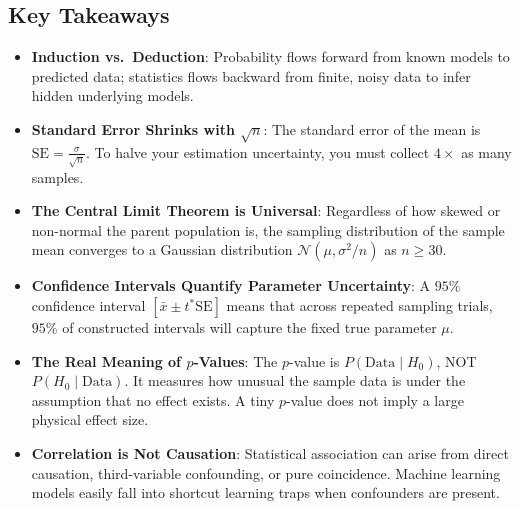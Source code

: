\subsection{Key Takeaways}\label{subsec:stat_takeaways}

\begin{takeaways}
\begin{itemize}
    \item \textbf{Induction vs.\ Deduction}: Probability flows forward from known models to predicted data; statistics flows backward from finite, noisy data to infer hidden underlying models.
    \item \textbf{Standard Error Shrinks with $\sqrt{n}$}: The standard error of the mean is $\text{SE} = \frac{\sigma}{\sqrt{n}}$. To halve your estimation uncertainty, you must collect $4\times$ as many samples.
    \item \textbf{The Central Limit Theorem is Universal}: Regardless of how skewed or non-normal the parent population is, the sampling distribution of the sample mean converges to a Gaussian distribution $\mathcal{N}(\mu, \sigma^2/n)$ as $n \ge 30$.
    \item \textbf{Confidence Intervals Quantify Parameter Uncertainty}: A $95\%$ confidence interval $[\bar{x} \pm t^* \text{SE}]$ means that across repeated sampling trials, $95\%$ of constructed intervals will capture the fixed true parameter $\mu$.
    \item \textbf{The Real Meaning of $p$-Values}: The $p$-value is $P(\text{Data} \mid H_0)$, NOT $P(H_0 \mid \text{Data})$. It measures how unusual the sample data is under the assumption that no effect exists. A tiny $p$-value does not imply a large physical effect size.
    \item \textbf{Correlation is Not Causation}: Statistical association can arise from direct causation, third-variable confounding, or pure coincidence. Machine learning models easily fall into shortcut learning traps when confounders are present.
\end{itemize}
\end{takeaways}

